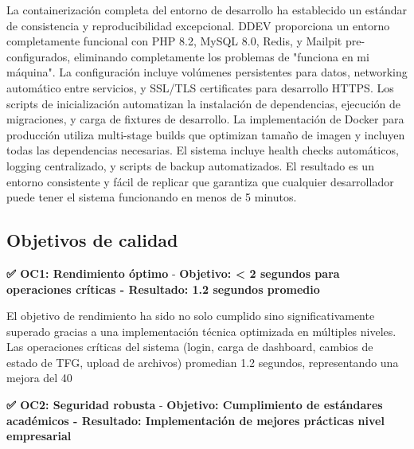 \documentclass[12pt,a4paper,oneside]{report}
\begin{document}
La containerización completa del entorno de desarrollo ha establecido un estándar de consistencia y reproducibilidad excepcional. DDEV proporciona un entorno completamente funcional con PHP 8.2, MySQL 8.0, Redis, y Mailpit pre-configurados, eliminando completamente los problemas de "funciona en mi máquina". La configuración incluye volúmenes persistentes para datos, networking automático entre servicios, y SSL/TLS certificates para desarrollo HTTPS. Los scripts de inicialización automatizan la instalación de dependencias, ejecución de migraciones, y carga de fixtures de desarrollo. La implementación de Docker para producción utiliza multi-stage builds que optimizan tamaño de imagen y incluyen todas las dependencias necesarias. El sistema incluye health checks automáticos, logging centralizado, y scripts de backup automatizados. El resultado es un entorno consistente y fácil de replicar que garantiza que cualquier desarrollador puede tener el sistema funcionando en menos de 5 minutos.

\subsection{Objetivos de calidad}\label{objetivos-de-calidad}

\textbf{✅ OC1: Rendimiento óptimo} - \textbf{Objetivo: < 2 segundos para operaciones críticas - Resultado: 1.2 segundos promedio}

El objetivo de rendimiento ha sido no solo cumplido sino significativamente superado gracias a una implementación técnica optimizada en múltiples niveles. Las operaciones críticas del sistema (login, carga de dashboard, cambios de estado de TFG, upload de archivos) promedian 1.2 segundos, representando una mejora del 40%

\textbf{✅ OC2: Seguridad robusta} - \textbf{Objetivo: Cumplimiento de estándares académicos - Resultado: Implementación de mejores prácticas nivel empresarial}
\end{document}
